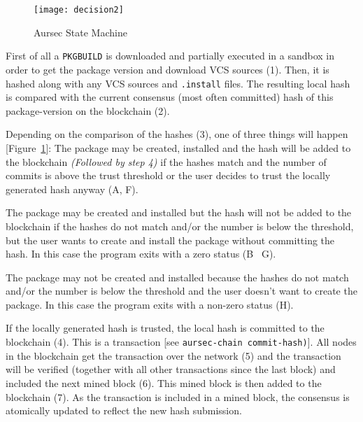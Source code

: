 \begin{figure}[!htb]
	\centering
		\texttt{[image: decision2]}
	\caption{Aursec State Machine}
	\label{fig:state_machine}
\end{figure}


First of all a \texttt{PKGBUILD} is downloaded and partially executed in a sandbox in order to get the package version and download VCS sources (1).
Then, it is hashed along with any VCS sources and \texttt{.install} files.
The resulting local hash is compared with the current consensus (most often committed) hash of this package-version on the blockchain (2).

Depending on the comparison of the hashes (3), one of three things will happen [Figure~\ref{fig:state_machine}]:
The package may be created, installed and the hash will be added to the blockchain \emph{(Followed by step 4)} if the hashes match and the number of commits is above the trust threshold or the user decides to trust the locally generated hash anyway (A, F).

The package may be created and installed but the hash will not be added to the blockchain if the hashes do not match and/or the number is below the threshold, but the user wants to create and install the package without committing the hash. In this case the program exits with a zero status (B \rightarrow~G).

The package may not be created and installed because the hashes do not match and/or the number is below the threshold and the user doesn't want to create the package. In this case the program exits with a non-zero status (H).

If the locally generated hash is trusted, the local hash is committed to the blockchain (4). This is a transaction [see \texttt{aursec-chain commit-hash)}].
All nodes in the blockchain get the transaction over the network (5) and the transaction will be verified (together with all other transactions since the last block) and included the next mined block (6).
This mined block is then added to the blockchain (7).
As the transaction is included in a mined block, the consensus is atomically updated to reflect the new hash submission.
